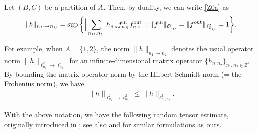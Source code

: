 \documentclass[%
11pt,  reqno]{amsart}
\newcommand{\1}{\hspace{0.2mm}\text{I}\hspace{0.2mm}}
\newcommand{\noi}{\noindent}
\newcommand{\Z}{\mathbb{Z}}
\renewcommand{\l}{\ell}
\numberwithin{equation}{section}
\numberwithin{theorem}{section}
\begin{document}
Let $(B, C)$ be a partition of $A$.
Then, 
by duality, we can write \eqref{Z0a} as 
\begin{align}
  \| h \|_{n_{B} \to n_{C}} = \sup \bigg\{ 
\Big|  \sum_{n_{B}, n_C} h_{n_A} f^\textup{in}_{n_{B}} f^\textup{out}_{n_C}\Big| : 
\| f^\textup{in} \|_{\l^2_{n_{B}}} =  \| f^\textup{out} \|_{\l^2_{n_{C}}} =1   \bigg\}.
\label{Z0x}
\end{align}
%


For example, when $A = \{1, 2\}$, 
the norm  $\| h \|_{n_{1} \to n_{2}}$ denotes the usual operator norm
$\| h \|_{\l^2_{n_{1}} \to \l^2_{n_{2}}}$
for an infinite-dimensional matrix operator $\{h_{n_1 n_2}\}_{n_1, n_2 \in \Z^d}$.
By bounding the matrix operator norm by the Hilbert-Schmidt norm (= the Frobenius norm), we have
\begin{align}
\| h \|_{\l^2_{n_{1}} \to \l^2_{n_{2}}} \le \| h\|_{\l^2_{n_1, n_2}}.
\label{Z0}
\end{align}

%









With the above notation, we have the following random tensor estimate,
originally introduced  in \cite[Propositions 4.14 and 4.15]{DNY3}; see also  \cite[Proposition 4.50]{Bring1} and \cite[Lemma C.3]{OWZ} for similar formulations as ours.
\end{document}
